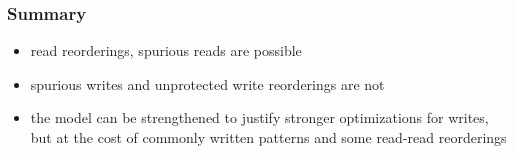 \begin{frame}
    \frametitle{Summary}
    \begin{itemize}
        \item read reorderings, spurious reads are possible
        \item spurious writes and unprotected write reorderings are not
        \item the model can be strengthened to justify stronger optimizations for
            writes, but at the cost of commonly written patterns and some read-read reorderings
    \end{itemize}
\end{frame}
